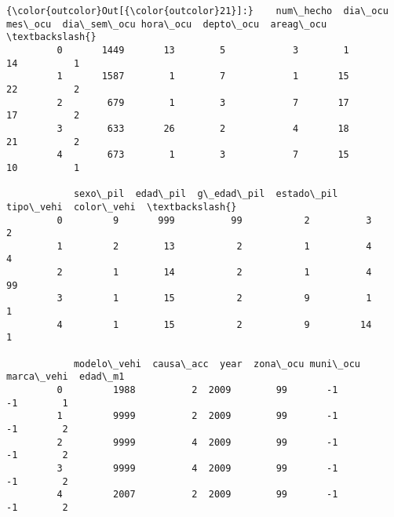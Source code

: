 \documentclass[11pt]{article}
\begin{document}
\begin{Verbatim}[commandchars=\\\{\}]
{\color{outcolor}Out[{\color{outcolor}21}]:}    num\_hecho  dia\_ocu  mes\_ocu  dia\_sem\_ocu hora\_ocu  depto\_ocu  areag\_ocu  \textbackslash{}
         0       1449       13        5            3        1         14          1   
         1       1587        1        7            1       15         22          2   
         2        679        1        3            7       17         17          2   
         3        633       26        2            4       18         21          2   
         4        673        1        3            7       15         10          1   
         
            sexo\_pil  edad\_pil  g\_edad\_pil  estado\_pil  tipo\_vehi  color\_vehi  \textbackslash{}
         0         9       999          99           2          3           2   
         1         2        13           2           1          4           4   
         2         1        14           2           1          4          99   
         3         1        15           2           9          1           1   
         4         1        15           2           9         14           1   
         
            modelo\_vehi  causa\_acc  year  zona\_ocu muni\_ocu  marca\_vehi  edad\_m1  
         0         1988          2  2009        99       -1          -1        1  
         1         9999          2  2009        99       -1          -1        2  
         2         9999          4  2009        99       -1          -1        2  
         3         9999          4  2009        99       -1          -1        2  
         4         2007          2  2009        99       -1          -1        2  
\end{Verbatim}
            
\end{document}
